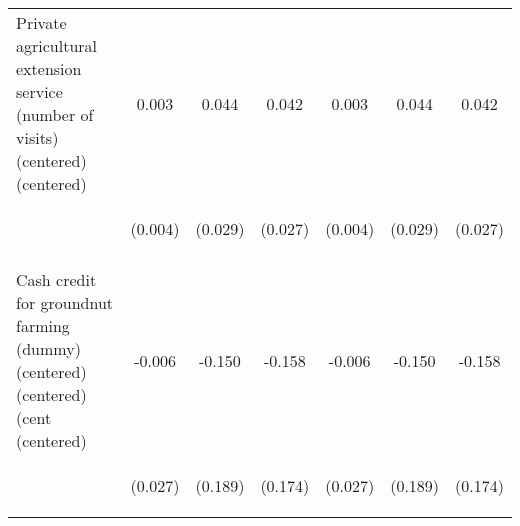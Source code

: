 \begin{center}
\begin{tabular}{lcccccc}
Private agricultural extension service (number of visits) (centered)  (centered) & 0.003 & 0.044 & 0.042 & 0.003 & 0.044 & 0.042 \\
 & \begin{footnotesize}(0.004)\end{footnotesize} & \begin{footnotesize}(0.029)\end{footnotesize} & \begin{footnotesize}(0.027)\end{footnotesize} & \begin{footnotesize}(0.004)\end{footnotesize} & \begin{footnotesize}(0.029)\end{footnotesize} & \begin{footnotesize}(0.027)\end{footnotesize} \\
\vspace{4pt} & \begin{footnotesize}[0.476]\end{footnotesize} & \begin{footnotesize}[0.128]\end{footnotesize} & \begin{footnotesize}[0.116]\end{footnotesize} & \begin{footnotesize}[0.476]\end{footnotesize} & \begin{footnotesize}[0.128]\end{footnotesize} & \begin{footnotesize}[0.116]\end{footnotesize} \\
Cash credit for groundnut farming (dummy) (centered) (centered) (cent (centered) & -0.006 & -0.150 & -0.158 & -0.006 & -0.150 & -0.158 \\
 & \begin{footnotesize}(0.027)\end{footnotesize} & \begin{footnotesize}(0.189)\end{footnotesize} & \begin{footnotesize}(0.174)\end{footnotesize} & \begin{footnotesize}(0.027)\end{footnotesize} & \begin{footnotesize}(0.189)\end{footnotesize} & \begin{footnotesize}(0.174)\end{footnotesize} \\

\end{tabular}
\end{center}
